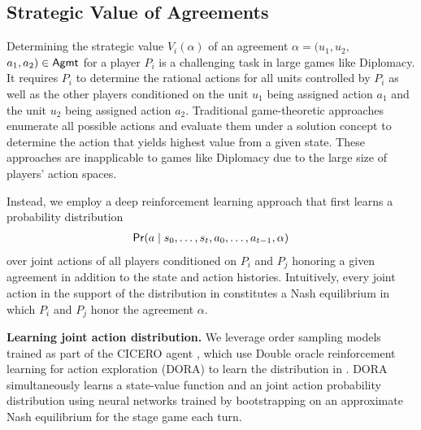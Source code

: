 \subsection{Strategic Value of Agreements}
%
%
%








Determining the strategic value $V_i(\alpha)$ of an agreement $\alpha = (u_1, u_2,$ $ a_1, a_2) \in \mathsf{Agmt}$ for a player $P_i$ is a challenging task in large games like Diplomacy. 
It requires $P_i$ to determine the rational actions for all units controlled by $P_i$ as well as the other players conditioned on the unit $u_1$ being assigned action $a_1$ and the unit $u_2$ being assigned action $a_2$. 
Traditional game-theoretic approaches \citep{gibbons1992primer} enumerate all possible actions and evaluate them under a solution concept to determine the action that yields highest value from a given state. 
These approaches are inapplicable to games like Diplomacy due to the large size of players' action spaces.

Instead, we employ a deep reinforcement learning approach that first learns a probability distribution 
\begin{align} \label{eq:joint-action-distribution}
	\mathsf{Pr}(a \mid s_0, \ldots, s_t, a_0, \ldots, a_{t-1},  \alpha)
\end{align} 
over joint actions of all players conditioned on $P_i$ and $P_j$ honoring a given agreement in addition to the state and action histories.
Intuitively, every joint action in the support of the distribution in  constitutes a Nash equilibrium in which $P_i$ and $P_j$ honor the agreement $\alpha$.




\textbf{Learning joint action distribution.} 
We leverage order sampling models trained as part of the CICERO agent \citep{CICERO}, which use Double oracle reinforcement learning for action exploration (DORA) \citep{bakhtin2021no} to learn the distribution in . DORA simultaneously learns a state-value function and an joint action probability distribution using neural networks trained by bootstrapping on an approximate Nash equilibrium for the stage game each turn.

